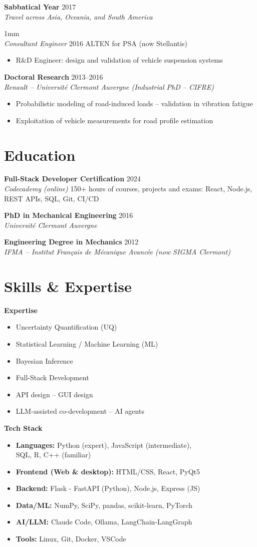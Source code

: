 \documentclass[10pt,a4paper]{article}
\newcommand{\resumeitem}[1]{\item\small{#1}}
\newcommand{\experience}[4]{
  \textbf{#1} \hfill \textcolor{mediumgray}{#2}\\
  \textit{\color{mediumgray}#3}%
  #4
  \vspace{1mm}
}
\begin{document}
\experience{Sabbatical Year}{2017}{Travel across Asia, Oceania, and South America}


\experience{Consultant Engineer}{2016}{ALTEN for PSA (now Stellantis)}{
\begin{itemize}
\item R\&D Engineer: design and validation of vehicle suspension systems
\end{itemize}
}

\experience{Doctoral Research}{2013--2016}{Renault -- Université Clermont Auvergne (Industrial PhD -- CIFRE)}{
\begin{itemize}
  \resumeitem{Probabilistic modeling of road-induced loads -- validation in vibration fatigue}
  \resumeitem{Exploitation of vehicle measurements for road profile estimation}
\end{itemize}
}

\section*{Education}

\experience{Full-Stack Developer Certification}{2024}{Codecademy (online)}{\hspace{0.2cm}150+ hours of courses, projects and exams: React, Node.js, REST APIs, SQL, Git, CI/CD
}

\experience{PhD in Mechanical Engineering}{2016}{Université Clermont Auvergne}{}

\experience{Engineering Degree in Mechanics}{2012}{IFMA -- Institut Français de Mécanique Avancée (now SIGMA Clermont)}{}



\section*{Skills \& Expertise}

\begin{minipage}[t]{0.48\textwidth}
\textbf{Expertise}
\begin{itemize}

  \resumeitem{Uncertainty Quantification (UQ)}
  \resumeitem{Statistical Learning / Machine Learning (ML)}
  \resumeitem{Bayesian Inference}
  \resumeitem{Full-Stack Development}
  \resumeitem{API design -- GUI design}
  \resumeitem{LLM-assisted co-development -- AI agents}
\end{itemize}
\end{minipage}%
\hfill
\begin{minipage}[t]{0.48\textwidth}
\textbf{Tech Stack}
\begin{itemize}
  \resumeitem{\textbf{Languages:} Python (expert), JavaScript (intermediate), \\ SQL, R, C++ (familiar)}
  \resumeitem{\textbf{Frontend (Web \& desktop):} HTML/CSS, React, PyQt5}
  \resumeitem{\textbf{Backend:} Flask - FastAPI (Python), Node.js, Express (JS)}
  \resumeitem{\textbf{Data/ML:} NumPy, SciPy, pandas, scikit-learn, PyTorch}
  \resumeitem{\textbf{AI/LLM:} Claude Code, Ollama, LangChain-LangGraph}
  \resumeitem{\textbf{Tools:} Linux, Git, Docker, VSCode}
\end{itemize}
\end{minipage}
\end{document}
